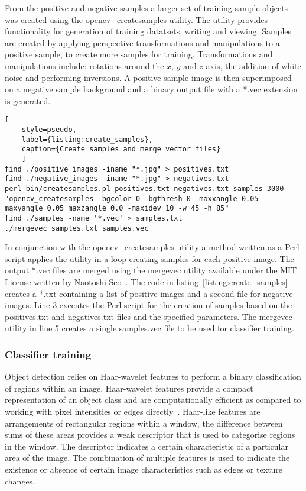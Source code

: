 From the positive and negative samples a larger set of training sample objects was created using the opencv\_createsamples utility. The utility provides functionality for generation of training datatsets, writing and viewing. Samples are created by applying perspective transformations and manipulations to a positive sample, to create more samples for training. Transformations and  manipulations include: rotations around the $x$, $y$ and $z$ axis, the addition of white noise and performing inversions. A positive sample image is then superimposed on a negative sample background and a binary output file with a *.vec extension is generated.

\begin{lstlisting}[
	style=pseudo,
	label={listing:create_samples},
	caption={Create samples and merge vector files}
	]
find ./positive_images -iname "*.jpg" > positives.txt
find ./negative_images -iname "*.jpg" > negatives.txt
perl bin/createsamples.pl positives.txt negatives.txt samples 3000 "opencv_createsamples -bgcolor 0 -bgthresh 0 -maxxangle 0.05 -maxyangle 0.05 maxzangle 0.0 -maxidev 10 -w 45 -h 85"
find ./samples -name '*.vec' > samples.txt
./mergevec samples.txt samples.vec
\end{lstlisting}

In conjunction with the opencv\_createsamples utility a method written as a Perl script applies the utility in a loop creating samples for each positive image. The output *.vec files are merged using the mergevec utility available under the MIT License written by Naotoshi Seo~\cite{Seo}. The code in listing~\ref{listing:create_samples} creates a *.txt containing a list of positive images and a second file for negative images. Line 3 executes the Perl script for the creation of samples based on the positives.txt and negatives.txt files and the specified parameters. The mergevec utility in line 5 creates a single samples.vec file to be used for classifier training.

\subsubsection{Classifier training}
Object detection relies on Haar-wavelet features to perform a binary classification of regions within an image. Haar-wavelet features provide a compact representation of an object class and are computationally efficient as compared to working with pixel intensities or edges directly~\cite{Papageorgiou1998}. Haar-like features are arrangements of rectangular regions within a window, the difference between sums of these areas provides a weak descriptor that is used to categorise regions in the window. The descriptor indicates a certain characteristic of a particular area of the image. The combination of multiple features is used to indicate the existence or absence of certain image characteristics such as edges or texture changes.

